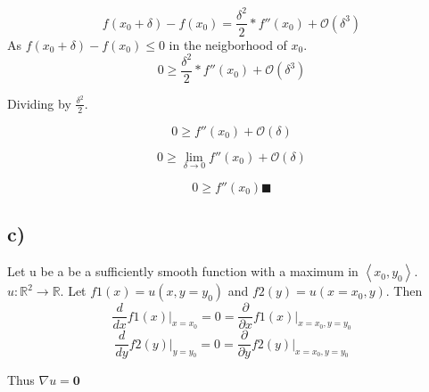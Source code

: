 \documentclass{article}
\begin{document}
\begin{multicols}{2}
\begin{equation*}
    f(x_{0}+\delta) - f(x_{0}) = \frac{\delta^2}{2}*f''(x_{0}) + \mathcal{O}(\delta^3)
\end{equation*}
 As $f(x_{0}+\delta) - f(x_{0}) \leq 0$ in the neigborhood of $x_{0}$.
\begin{equation*}
    0 \geq \frac{\delta^2}{2}*f''(x_{0}) + \mathcal{O}(\delta^3)
\end{equation*}

Dividing by $\frac{\delta^2}{2}$.

\begin{equation*}
    0 \geq f''(x_{0}) + \mathcal{O}(\delta)
\end{equation*}

\begin{equation*}
    0 \geq \lim_{\delta \to 0} f''(x_{0}) + \mathcal{O}(\delta)
\end{equation*}

\begin{equation*}
    0 \geq f''(x_{0}) \blacksquare
\end{equation*}

\subsection{c)}
Let u be a be a sufficiently smooth function with a maximum in $ \left<x_{0}, y_{0}\right> $.$ u: \mathbb{R}^{2} \to \mathbb{R} $.
Let $f1(x) = u(x,y=y_{0})$ and $f2(y) = u(x=x_{0},y)$. Then
\begin{equation*}
    \frac{d}{dx}f1(x)\bigg|_{x=x_{0}} = 0 = \frac{\partial}{\partial x}f1(x)\bigg|_{x=x_{0},y=y_{0}}
\end{equation*}{}
\begin{equation*}
    \frac{d}{dy}f2(y)\bigg|_{y=y_{0}} = 0 = \frac{\partial}{\partial y}f2(y)\bigg|_{x=x_{0},y=y_{0}}
\end{equation*}{}

Thus $\nabla u = \mathbf{0}$
\end{multicols}
\end{document}
